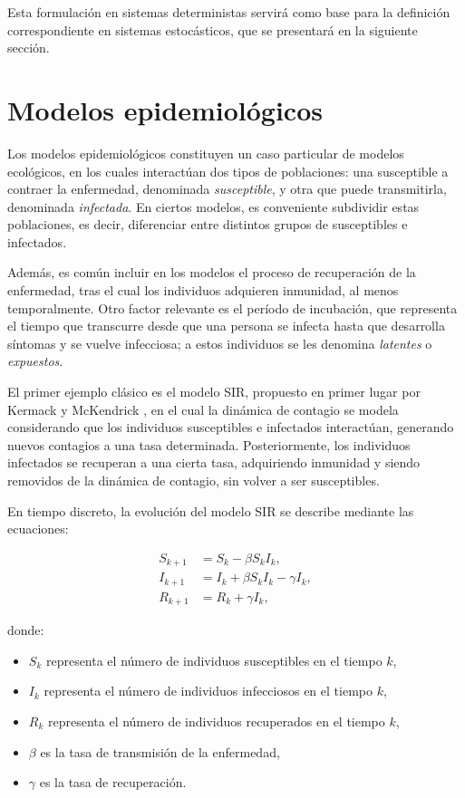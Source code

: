 Esta formulación en sistemas deterministas servirá como base para la definición correspondiente en sistemas estocásticos, que se presentará en la siguiente sección.

\section{Modelos epidemiológicos}

Los modelos epidemiológicos constituyen un caso particular de modelos ecológicos, en los cuales interactúan dos tipos de poblaciones: una susceptible a contraer la enfermedad, denominada \textit{susceptible}, y otra que puede transmitirla, denominada \textit{infectada}. En ciertos modelos, es conveniente subdividir estas poblaciones, es decir, diferenciar entre distintos grupos de susceptibles e infectados.

Además, es común incluir en los modelos el proceso de recuperación de la enfermedad, tras el cual los individuos adquieren inmunidad, al menos temporalmente. Otro factor relevante es el período de incubación, que representa el tiempo que transcurre desde que una persona se infecta hasta que desarrolla síntomas y se vuelve infecciosa; a estos individuos se les denomina \textit{latentes} o \textit{expuestos}.

El primer ejemplo clásico es el modelo SIR, propuesto en primer lugar por Kermack y McKendrick \cite{Kermack1991ContributionsEndemicity, Kermack1991ContributionsEpidemicsI, Kermack1991ContributionsEndemicityb}, en el cual la dinámica de contagio se modela considerando que los individuos susceptibles e infectados interactúan, generando nuevos contagios a una tasa determinada. Posteriormente, los individuos infectados se recuperan a una cierta tasa, adquiriendo inmunidad y siendo removidos de la dinámica de contagio, sin volver a ser susceptibles.

En tiempo discreto, la evolución del modelo SIR se describe mediante las ecuaciones:

\begin{equation}
    \begin{aligned}
    S_{k+1} &= S_k -\beta S_k I_k, \\
    I_{k+1} &= I_k + \beta S_k I_k - \gamma I_k, \\
    R_{k+1} &= R_k + \gamma I_k,
    \end{aligned}
    \label{eq:SIR}
\end{equation}

donde:
\begin{itemize}
    \item \(S_k\) representa el número de individuos susceptibles en el tiempo \(k\),
    \item \(I_k\) representa el número de individuos infecciosos en el tiempo \(k\),
    \item \(R_k\) representa el número de individuos recuperados en el tiempo \(k\),
    \item \(\beta\) es la tasa de transmisión de la enfermedad,
    \item \(\gamma\) es la tasa de recuperación.
\end{itemize}

